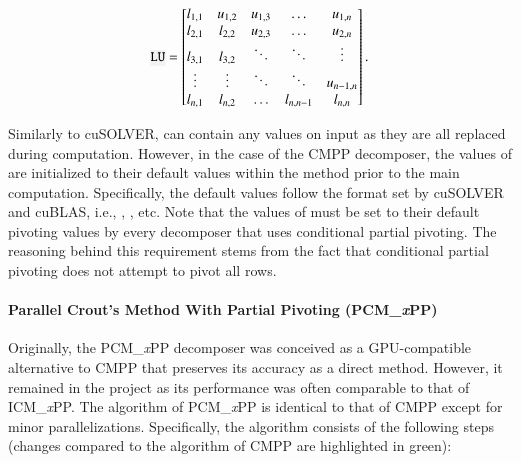 \begin{equation}
	\code{LU} = {
		\begin{bmatrix}
			l _{1,1} & u _{1,2} & u _{1,3} & \ldots    & u _{1,n}   \\
			l_{2,1}	 & l _{2,2} & u _{2,3} & \ldots    & u _{2,n}   \\
			l_{3,1}  & l_{3,2} 	& \ddots   & \ddots    & \vdots 	 \\
			\vdots   & \vdots	& \ddots   & \ddots    & u _{n-1,n} \\
			l_{n,1}	 & l_{n,2}	& \ldots   & l_{n,n-1} & l _{n,n}
		\end{bmatrix}
	} \,.
	\label{Equation:implementation->decomposition-project->implemented-solutions->decomposers->CMPP}
\end{equation}

Similarly to cuSOLVER,  can contain any values on input as they are all replaced during computation. However, in the case of the CMPP decomposer, the values of  are initialized to their default values within the  method prior to the main computation. Specifically, the default values follow the format set by cuSOLVER and cuBLAS, i.e., , , etc. Note that the values of  must be set to their default pivoting values by every decomposer that uses conditional partial pivoting. The reasoning behind this requirement stems from the fact that conditional partial pivoting does not attempt to pivot all rows.

\paragraph{Parallel Crout's Method With Partial Pivoting (PCM\_\textit{x}PP)} Originally, the PCM\_\textit{x}PP decomposer was conceived as a GPU-compatible alternative to CMPP that preserves its accuracy as a direct method. However, it remained in the project as its performance was often comparable to that of ICM\_\textit{x}PP. The algorithm of PCM\_\textit{x}PP is identical to that of CMPP except for minor parallelizations. Specifically, the algorithm consists of the following steps (changes compared to the algorithm of CMPP are highlighted in green):

